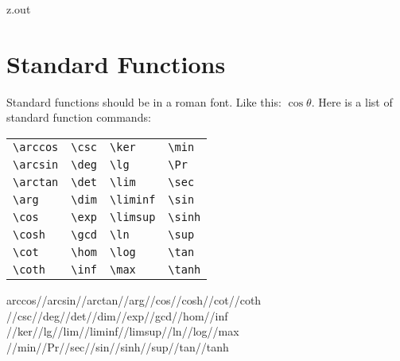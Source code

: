 \begin{VerbatimOut}{z.out}
\newpage

\section{Standard Functions}

Standard functions should be in a roman font.
Like this: \(\cos\theta\).
Here is a list of standard function commands:\\

\begin{tabular}{@{\hspace*{\parindent}}llll@{}}
  \verb+\arccos+& \verb+\csc+& \verb+\ker+&    \verb+\min+\\
  \verb+\arcsin+& \verb+\deg+& \verb+\lg+&     \verb+\Pr+\\
  \verb+\arctan+& \verb+\det+& \verb+\lim+&    \verb+\sec+\\
  \verb+\arg+&    \verb+\dim+& \verb+\liminf+& \verb+\sin+\\
  \verb+\cos+&    \verb+\exp+& \verb+\limsup+& \verb+\sinh+\\
  \verb+\cosh+&   \verb+\gcd+& \verb+\ln+&     \verb+\sup+\\
  \verb+\cot+&    \verb+\hom+& \verb+\log+&    \verb+\tan+\\
  \verb+\coth+&   \verb+\inf+& \verb+\max+&    \verb+\tanh+\\
\end{tabular}
\ix
{%
  arccos//arcsin//arctan//arg//cos//cosh//cot//coth%
  //csc//deg//det//dim//exp//gcd//hom//inf%
  //ker//lg//lim//liminf//limsup//ln//log//max%
  //min//Pr//sec//sin//sinh//sup//tan//tanh%
}
\index{\verb+\arccos+} \index{\verb+\arcsin+} \index{\verb+\arctan+} \index{\verb+\arg+}
\index{\verb+\cos+} \index{\verb+\cosh+} \index{\verb+\cot+} \index{\verb+\coth+}
\index{\verb+\csc+} \index{\verb+\deg+} \index{\verb+\det+} \index{\verb+\dim+}
\index{\verb+\exp+} \index{\verb+\gcd+} \index{\verb+\hom+} \index{\verb+\inf+}
\index{\verb+\ker+} \index{\verb+\lg+} \index{\verb+\lim+} \index{\verb+\liminf+}
\index{\verb+\limsup+} \index{\verb+\ln+} \index{\verb+\log+} \index{\verb+\max+}
\index{\verb+\min+} \index{\verb+\Pr+} \index{\verb+\sec+} \index{\verb+\sin+}
\index{\verb+\sinh+} \index{\verb+\sup+} \index{\verb+\tan+} \index{\verb+\tanh+}
\end{VerbatimOut}

